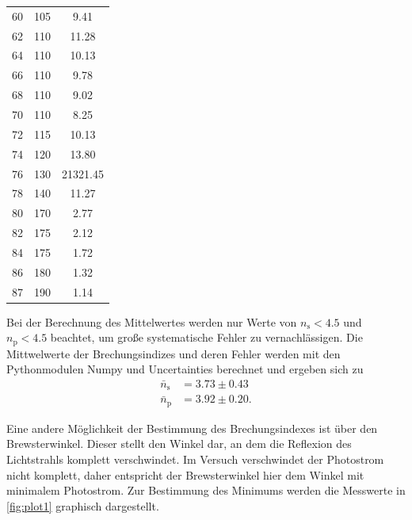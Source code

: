 \begin{table}[H]
\begin{tabular}{S[table-format=2.0] S S[table-format=2.2]}
    60 & 105 &  9.41\\
    62 & 110 &  11.28\\
    64 & 110 &  10.13\\
    66 & 110 &  9.78\\
    68 & 110 &  9.02\\
    70 & 110 &  8.25\\
    72 & 115 &  10.13\\
    74 & 120 &  13.80\\
    76 & 130 &  21321.45\\
    78 & 140 &  11.27\\
    80 & 170 &  2.77\\
    82 & 175 &  2.12\\
    84 & 175 &  1.72\\
    86 & 180 &  1.32\\
    87 & 190 &  1.14\\
   \bottomrule
  \end{tabular}
\end{table}


Bei der Berechnung des Mittelwertes werden nur Werte von $n_{\text{s}}<4.5$ und $n_{\text{p}}<4.5$
beachtet, um große systematische Fehler zu vernachlässigen.
Die Mittwelwerte der Brechungsindizes und deren Fehler werden mit den Pythonmodulen Numpy \cite{numpy} und Uncertainties \cite{uncertainties} berechnet
und ergeben sich zu
\begin{align*}
  \bar{n}_{\text{s}}&=3.73 \pm 0.43 \\
  \bar{n}_{\text{p}}&=3.92 \pm 0.20.
\end{align*}

Eine andere Möglichkeit der Bestimmung des Brechungsindexes ist über den Brewsterwinkel.
Dieser stellt den Winkel dar, an dem die Reflexion des Lichtstrahls komplett verschwindet.
Im Versuch verschwindet der Photostrom nicht komplett, daher entspricht der Brewsterwinkel hier dem Winkel mit minimalem Photostrom.
Zur Bestimmung des Minimums werden die Messwerte in \autoref{fig:plot1} graphisch dargestellt.

